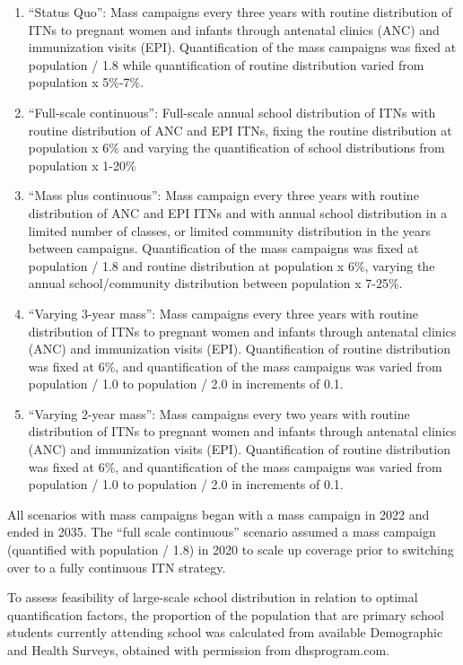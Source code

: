 \documentclass[review,
3p]{elsarticle} %
\providecommand{\tightlist}{%
  \setlength{\itemsep}{0pt}\setlength{\parskip}{0pt}}
\begin{document}
\begin{enumerate}
\def\labelenumi{\arabic{enumi}.}
\tightlist
\item
  ``Status Quo'': Mass campaigns every three years with routine
  distribution of ITNs to pregnant women and infants through antenatal
  clinics (ANC) and immunization visits (EPI). Quantification of the
  mass campaigns was fixed at population / 1.8 while quantification of
  routine distribution varied from population x 5\%-7\%.
\item
  ``Full-scale continuous'': Full-scale annual school distribution of
  ITNs with routine distribution of ANC and EPI ITNs, fixing the routine
  distribution at population x 6\% and varying the quantification of
  school distributions from population x 1-20\%
\item
  ``Mass plus continuous'': Mass campaign every three years with routine
  distribution of ANC and EPI ITNs and with annual school distribution
  in a limited number of classes, or limited community distribution in
  the years between campaigns. Quantification of the mass campaigns was
  fixed at population / 1.8 and routine distribution at population x
  6\%, varying the annual school/community distribution between
  population x 7-25\%.
\item
  ``Varying 3-year mass'': Mass campaigns every three years with routine
  distribution of ITNs to pregnant women and infants through antenatal
  clinics (ANC) and immunization visits (EPI). Quantification of routine
  distribution was fixed at 6\%, and quantification of the mass
  campaigns was varied from population / 1.0 to population / 2.0 in
  increments of 0.1.
\item
  ``Varying 2-year mass'': Mass campaigns every two years with routine
  distribution of ITNs to pregnant women and infants through antenatal
  clinics (ANC) and immunization visits (EPI). Quantification of routine
  distribution was fixed at 6\%, and quantification of the mass
  campaigns was varied from population / 1.0 to population / 2.0 in
  increments of 0.1.
\end{enumerate}

All scenarios with mass campaigns began with a mass campaign in 2022 and
ended in 2035. The ``full scale continuous'' scenario assumed a mass
campaign (quantified with population / 1.8) in 2020 to scale up coverage
prior to switching over to a fully continuous ITN strategy.

To assess feasibility of large-scale school distribution in relation to
optimal quantification factors, the proportion of the population that
are primary school students currently attending school was calculated
from available Demographic and Health Surveys, obtained with permission
from dhsprogram.com.
\end{document}
